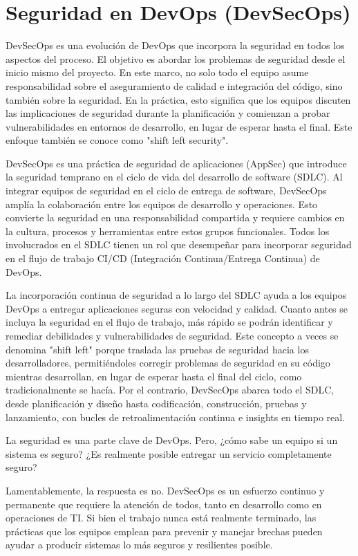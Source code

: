 \documentclass[12pt]{book}
\begin{document}
\section{Seguridad en DevOps (DevSecOps)}

DevSecOps es una evolución de DevOps que incorpora la seguridad en todos los aspectos del proceso. El objetivo es abordar los problemas de seguridad desde el inicio mismo del proyecto. En este marco, no solo todo el equipo asume responsabilidad sobre el aseguramiento de calidad e integración del código, sino también sobre la seguridad. En la práctica, esto significa que los equipos discuten las implicaciones de seguridad durante la planificación y comienzan a probar vulnerabilidades en entornos de desarrollo, en lugar de esperar hasta el final. Este enfoque también se conoce como "shift left security".

DevSecOps es una práctica de seguridad de aplicaciones (AppSec) que introduce la seguridad temprano en el ciclo de vida del desarrollo de software (SDLC). Al integrar equipos de seguridad en el ciclo de entrega de software, DevSecOps amplía la colaboración entre los equipos de desarrollo y operaciones. Esto convierte la seguridad en una responsabilidad compartida y requiere cambios en la cultura, procesos y herramientas entre estos grupos funcionales. Todos los involucrados en el SDLC tienen un rol que desempeñar para incorporar seguridad en el flujo de trabajo CI/CD (Integración Continua/Entrega Continua) de DevOps.

La incorporación continua de seguridad a lo largo del SDLC ayuda a los equipos DevOps a entregar aplicaciones seguras con velocidad y calidad. Cuanto antes se incluya la seguridad en el flujo de trabajo, más rápido se podrán identificar y remediar debilidades y vulnerabilidades de seguridad. Este concepto a veces se denomina "shift left" porque traslada las pruebas de seguridad hacia los desarrolladores, permitiéndoles corregir problemas de seguridad en su código mientras desarrollan, en lugar de esperar hasta el final del ciclo, como tradicionalmente se hacía. Por el contrario, DevSecOps abarca todo el SDLC, desde planificación y diseño hasta codificación, construcción, pruebas y lanzamiento, con bucles de retroalimentación continua e insights en tiempo real.

La seguridad es una parte clave de DevOps. Pero, ¿cómo sabe un equipo si un sistema es seguro? ¿Es realmente posible entregar un servicio completamente seguro?

Lamentablemente, la respuesta es no. DevSecOps es un esfuerzo continuo y permanente que requiere la atención de todos, tanto en desarrollo como en operaciones de TI. Si bien el trabajo nunca está realmente terminado, las prácticas que los equipos emplean para prevenir y manejar brechas pueden ayudar a producir sistemas lo más seguros y resilientes posible.
\end{document}
